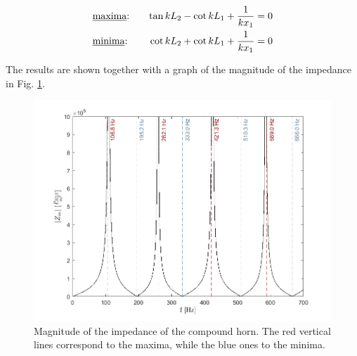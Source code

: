 \documentclass[a4paper]{article}
\begin{document}
\begin{align*}
	&\text{\underline{maxima}:} \quad & \tan{kL_2} - \cot{kL_1} + \frac{1}{kx_1} = 0\\
	&\text{\underline{minima}:} \quad & \cot{kL_2} + \cot{kL_1} + \frac{1}{kx_1} = 0
\end{align*}

The results are shown together with a graph of the magnitude of the impedance in Fig. \ref{fig:maxmin}.

\begin{figure}[h!]
	\centering
	\includegraphics[width=0.8\linewidth]{maxmin.png}
	\caption{Magnitude of the impedance of the compound horn. The red vertical lines correspond to the maxima, while the blue ones to the minima.}
	\label{fig:maxmin}
\end{figure}
\end{document}
